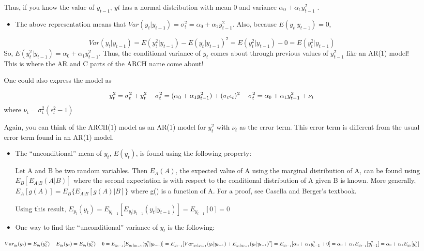 \documentclass[
]{book}
\providecommand{\tightlist}{%
  \setlength{\itemsep}{0pt}\setlength{\parskip}{0pt}}
\theoremstyle{definition}
\theoremstyle{definition}
\theoremstyle{definition}
\theoremstyle{definition}
\theoremstyle{remark}
\begin{document}
Thus, if you know the value of \(y_{t-1}\), \(yt\) has a normal distribution with mean 0 and variance \(\alpha_0+\alpha_1y^2_{t-1}\) .

\begin{itemize}
\tightlist
\item
  The above representation means that \(Var(y_t|y_{t-1}) = \sigma^2_t = \alpha_0 + \alpha_1y^2_{t-1}\). Also, because \(E(y_t|y_{t-1}) = 0\),
\end{itemize}

\[Var(y_t|y_{t-1})=E(y_t^2|y_{t-1})-E(y_t|y_{t-1})^2=E(y_t^2|y_{t-1})-0=E(y_t^2|y_{t-1})\]
So, \(E(y_t^2|y_{t-1})=\alpha_0+\alpha_1y^2_{t-1}.\) Thus, the conditional variance of \(y_t\) comes about through previous values of \(y^2_{t-1}\) like an AR(1) model! This is where the AR and C parts of the ARCH name come about!

One could also express the model as

\[y_t^2=\sigma_t^2+y_t^2-\sigma_t^2\\=(\alpha_0+\alpha_1y^2_{t-1})+(\sigma_t\epsilon_t)^2-\sigma_t^2\\=\alpha_0+\alpha_1y^2_{t-1}+\nu_t\] where \(\nu_t=\sigma_t^2(\epsilon_t^2-1)\)

Again, you can think of the ARCH(1) model as an AR(1) model for \(y_t^2\) with \(\nu_t\) as the error term. This error term is different from the usual error term found in an AR(1) model.

\begin{itemize}
\item
  The ``unconditional'' mean of \(y_t\), \(E(y_t)\), is found using the following property:

  Let A and B be two random variables. Then \(E_A(A)\), the expected value of A using the marginal distribution of A, can be found using \(E_B[E_{A|B}(A|B)]\) where the second expectation is with respect to the conditional distribution of A given B is known. More generally, \(E_A[g(A)]=E_B\{E_{A|B}[g(A)|B]\}\) where g() is a function of A. For a proof, see Casella and Berger's textbook.

  Using this result, \(E_{y_t}(y_t)=E_{y_{t-1}}[E_{y_t|y_{t-1}}(y_t|y_{t-1})]=E_{y_{t-1}}[0]=0\)
\item
  One way to find the ``unconditional'' variance of \(y_t\) is the following:
\end{itemize}

\[Var_{y_t}(y_t)=E_{y_t}(y_t^2)-E_{y_t}(y_t)\\
=E_{y_t}(y_t^2)-0\\
=E_{y_{t-1}}[E_{y_t|y_{t-1}}(y_t^2|y_{t-1})]\\
=E_{y_{t-1}}[Var_{y_t|y_{t-1}}(y_t|y_{t-1})+E_{y_t|y_{t-1}}(y_t|y_{t-1})^2]\\
=E_{y_{t-1}}[\alpha_0+\alpha_1y_{t-1}^2+0]\\
=\alpha_0+\alpha_1E_{y_{t-1}}[y^2_{t-1}]\\
=\alpha_0+\alpha_1E_{y_t}[y_t^2]\]
\end{document}
